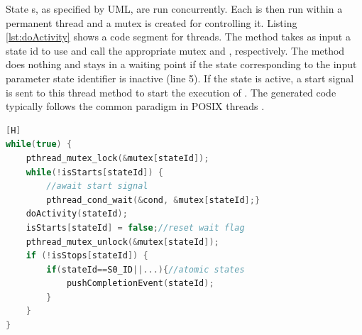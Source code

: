 State s, as specified by UML, are run concurrently. 
Each  is then run within a permanent thread and a mutex is created for controlling it. 
Listing \ref{lst:doActivity} shows a code segment for  threads. The method  takes as input a state id to use and call the appropriate mutex and , respectively. 
The method does nothing and stays in a waiting point if the state corresponding to the input parameter state identifier is inactive (line 5).
If the state is active, a start signal is sent to this thread method to start the execution of .
The generated code typically follows the common paradigm in POSIX threads \cite{Posix}.

\begin{lstlisting}[caption=Example code generated for doActivity, label=lst:doActivity, language=C++,float][H]
while(true) {
	pthread_mutex_lock(&mutex[stateId]);
	while(!isStarts[stateId]) { 
		//await start signal     
		pthread_cond_wait(&cond, &mutex[stateId];}	
	doActivity(stateId);
	isStarts[stateId] = false;//reset wait flag
	pthread_mutex_unlock(&mutex[stateId]);
	if (!isStops[stateId]) {
		if(stateId==S0_ID||...){//atomic states
			pushCompletionEvent(stateId);
		}
	}
}
\end{lstlisting}


